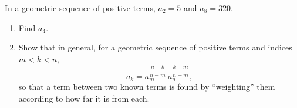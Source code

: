 In a geometric sequence of positive terms, $a_2=5$ and $a_8=320$.
\begin{enumerate}
\item[(a)] Find $a_4$.
\item[(b)] Show that in general, for a geometric sequence of positive terms and indices $m<k<n$,
\[
a_k=a_m^{\dfrac{n-k}{n-m}}\,a_n^{\dfrac{k-m}{n-m}} ,
\]
so that a term between two known terms is found by ``weighting'' them according to how far it is from each.
\end{enumerate}

